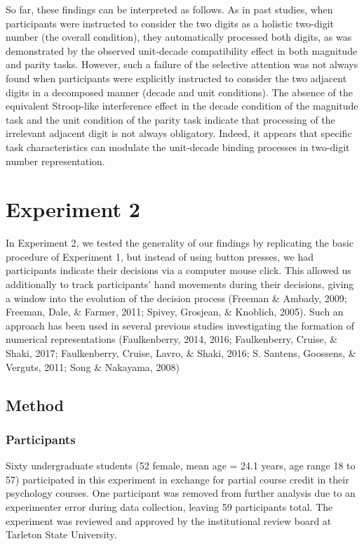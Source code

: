 \documentclass[english,man]{apa6}
\theoremstyle{definition}
\theoremstyle{definition}
\theoremstyle{definition}
\theoremstyle{remark}
\begin{document}
So far, these findings can be interpreted as follows. As in past
studies, when participants were instructed to consider the two digits as
a holistic two-digit number (the overall condition), they automatically
processed both digits, as was demonstrated by the observed unit-decade
compatibility effect in both magnitude and parity tasks. However, such a
failure of the selective attention was not always found when
participants were explicitly instructed to consider the two adjacent
digits in a decomposed manner (decade and unit conditions). The absence
of the equivalent Stroop-like interference effect in the decade
condition of the magnitude task and the unit condition of the parity
task indicate that processing of the irrelevant adjacent digit is not
always obligatory. Indeed, it appears that specific task characteristics
can modulate the unit-decade binding processes in two-digit number
representation.

\section{Experiment 2}\label{experiment-2}

In Experiment 2, we tested the generality of our findings by replicating
the basic procedure of Experiment 1, but instead of using button
presses, we had participants indicate their decisions via a computer
mouse click. This allowed us additionally to track participants' hand
movements during their decisions, giving a window into the evolution of
the decision process (Freeman \& Ambady, 2009; Freeman, Dale, \& Farmer,
2011; Spivey, Grosjean, \& Knoblich, 2005). Such an approach has been
used in several previous studies investigating the formation of
numerical representations (Faulkenberry, 2014, 2016; Faulkenberry,
Cruise, \& Shaki, 2017; Faulkenberry, Cruise, Lavro, \& Shaki, 2016; S.
Santens, Goossens, \& Verguts, 2011; Song \& Nakayama, 2008)

\subsection{Method}\label{method-1}

\subsubsection{Participants}\label{participants-1}

Sixty undergraduate students (52 female, mean age = 24.1 years, age
range 18 to 57) participated in this experiment in exchange for partial
course credit in their psychology courses. One participant was removed
from further analysis due to an experimenter error during data
collection, leaving 59 participants total. The experiment was reviewed
and approved by the institutional review board at Tarleton State
University.
\end{document}

